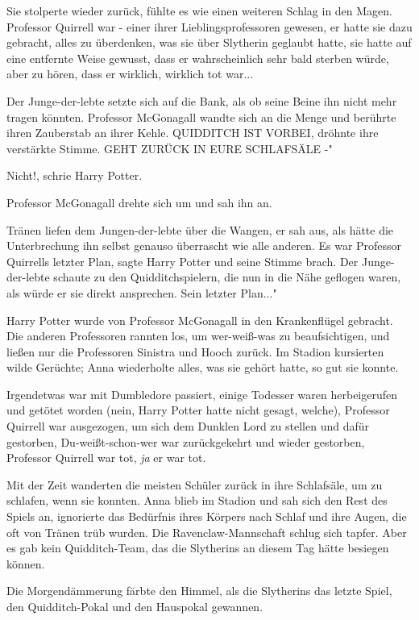 Sie stolperte wieder zurück, fühlte es wie einen weiteren Schlag in den Magen.
Professor Quirrell war - einer ihrer Lieblingsprofessoren gewesen, er hatte sie
dazu gebracht, alles zu überdenken, was sie über Slytherin geglaubt hatte, sie
hatte auf eine entfernte Weise gewusst, dass er wahrscheinlich sehr bald sterben
würde, aber zu hören, dass er wirklich, wirklich tot war...

Der Junge-der-lebte setzte sich auf die Bank, als ob seine Beine ihn nicht mehr
tragen könnten. Professor McGonagall wandte sich an die Menge und berührte ihren
Zauberstab an ihrer Kehle. \glqq QUIDDITCH IST VORBEI\grqq{}, dröhnte ihre
verstärkte Stimme. \glqq GEHT ZURÜCK IN EURE SCHLAFSÄLE -"

\glqq Nicht!\grqq{}, schrie Harry Potter.

Professor McGonagall drehte sich um und sah ihn an.

Tränen liefen dem Jungen-der-lebte über die Wangen, er sah aus, als hätte die
Unterbrechung ihn selbst genauso überrascht wie alle anderen. \glqq Es war
Professor Quirrells letzter Plan\grqq{}, sagte Harry Potter und seine Stimme
brach. Der Junge-der-lebte schaute zu den Quidditchspielern, die nun in die Nähe
geflogen waren, als würde er sie direkt ansprechen. \glqq Sein letzter Plan..."

Harry Potter wurde von Professor McGonagall in den Krankenflügel gebracht. Die
anderen Professoren rannten los, um wer-weiß-was zu beaufsichtigen, und ließen
nur die Professoren Sinistra und Hooch zurück. Im Stadion kursierten wilde
Gerüchte; Anna wiederholte alles, was sie gehört hatte, so gut sie konnte.

Irgendetwas war mit Dumbledore passiert, einige Todesser waren herbeigerufen und
getötet worden (nein, Harry Potter hatte nicht gesagt, welche), Professor
Quirrell war ausgezogen, um sich dem Dunklen Lord zu stellen und dafür
gestorben, Du-weißt-schon-wer war zurückgekehrt und wieder gestorben, Professor
Quirrell war tot, \emph{ja} er war tot.

Mit der Zeit wanderten die meisten Schüler zurück in ihre Schlafsäle, um zu
schlafen, wenn sie konnten. Anna blieb im Stadion und sah sich den Rest des
Spiels an, ignorierte das Bedürfnis ihres Körpers nach Schlaf und ihre Augen,
die oft von Tränen trüb wurden. Die Ravenclaw-Mannschaft schlug sich tapfer.
Aber es gab kein Quidditch-Team, das die Slytherins an diesem Tag hätte besiegen
können.

Die Morgendämmerung färbte den Himmel, als die Slytherins das letzte Spiel, den
Quidditch-Pokal und den Hauspokal gewannen.

